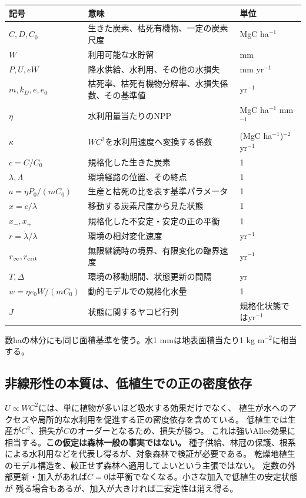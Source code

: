 \documentclass[a4paper,11pt]{ltjsarticle}
\begin{document}
\begin{longtable}{p{.18\linewidth}p{.49\linewidth}p{.26\linewidth}}
\toprule 記号 & 意味 & 単位\\\midrule\endhead
$C,D,C_0$ & 生きた炭素、枯死有機物、一定の炭素尺度 & MgC ha$^{-1}$\\
$W$ & 利用可能な水貯留 & mm\\
$P,U,eW$ & 降水供給、水利用、その他の水損失 & mm yr$^{-1}$\\
$m,k_D,e,e_0$ & 枯死率、枯死有機物分解率、水損失係数、その基準値 & yr$^{-1}$\\
$\eta$ & 水利用量当たりのNPP & MgC ha$^{-1}$ mm$^{-1}$\\
$\kappa$ & $WC^2$を水利用速度へ変換する係数 & (MgC ha$^{-1}$)$^{-2}$ yr$^{-1}$\\
$c=C/C_0$ & 規格化した生きた炭素 & 1\\
$\lambda,\Lambda$ & 環境経路の位置、その終点 & 1\\
$a=\eta P_0/(mC_0)$ & 生産と枯死の比を表す基準パラメータ & 1\\
$x=c/\lambda$ & 移動する炭素尺度から見た状態 & 1\\
$x_-,x_+$ & 規格化した不安定・安定の正の平衡 & 1\\
$r=\dot\lambda/\lambda$ & 環境の相対変化速度 & yr$^{-1}$\\
$r_\infty,r_{\rm crit}$ & 無限継続時の境界、有限変化の臨界速度 & yr$^{-1}$\\
$T,\Delta$ & 環境の移動期間、状態更新の間隔 & yr\\
$w=\eta e_0W/(mC_0)$ & 動的モデルでの規格化水量 & 1\\
$J$ & 状態に関するヤコビ行列 & 規格化状態ではyr$^{-1}$\\
\bottomrule
\end{longtable}
数haの林分にも同じ面積基準を使う。水1 mmは地表面積当たり1 kg m$^{-2}$に相当する。

\subsection{非線形性の本質は、低植生での正の密度依存}
$U\propto WC^2$には、単に植物が多いほど吸水する効果だけでなく、
植生が水へのアクセスや局所的な水利用を促進する正の密度依存を含めている。
低植生では生産が$C^2$、損失が$C$のオーダーとなるため、損失が勝つ。
これは強いAllee効果に相当する。\textbf{この仮定は森林一般の事実ではない。}
種子供給、林冠の保護、根系による水利用などを代表し得るが、対象森林で検証が必要である。
乾燥地植生のモデル構造を、較正せず森林へ適用してよいという主張ではない。
定数の外部更新・加入があれば$C=0$は平衡でなくなる。小さな加入で低植生の安定状態が
残る場合もあるが、加入が大きければ二安定性は消え得る。
\end{document}

